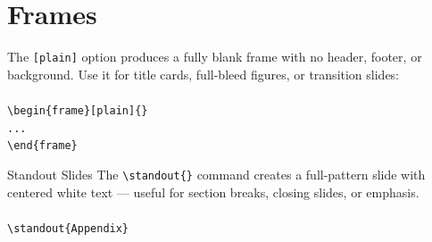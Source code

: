 \documentclass[aspectratio=169]{beamer}
\begin{document}
\section{Frames}
    
    \begin{frame}[plain]{}
        The \texttt{[plain]} option produces a fully blank frame with no header, footer, or background. Use it for title cards, full-bleed figures, or transition slides:
        \\ ~ \\
        \texttt{\textbackslash begin\{frame\}[plain]\{\}} \\
        \texttt{...} \\
        \texttt{\textbackslash end\{frame\}}
    \end{frame}

    
    \begin{frame}{Standout Slides}
        The \texttt{\textbackslash standout\{\}} command creates a full-pattern slide with centered white text — useful for section breaks, closing slides, or emphasis.
        \\ ~ \\
        \scriptsize
        \texttt{\textbackslash standout\{Appendix\}}
        \normalsize
    \end{frame}
    

\appendix
\end{document}
